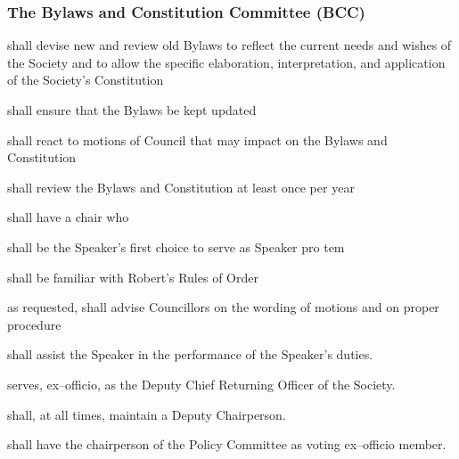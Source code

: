 \subsubsection{The Bylaws and Constitution Committee (BCC)}
\begin{longenum}[ label*=\thesubsubsection.\arabic*., align=left]
	\item shall devise new and review old Bylaws to reflect the current needs and wishes of the Society and to allow the specific elaboration, interpretation, and application of the Society's Constitution 
    \item shall ensure that the Bylaws be kept updated
    \item shall react to motions of Council that may impact on the Bylaws and Constitution
    \item shall review the Bylaws and Constitution at least once per year
    \item shall have a chair who
    \begin{longenum}[ label*=\arabic*., align=left]
		\item shall be the Speaker's first choice to serve as Speaker pro tem
        \item shall be familiar with Robert's Rules of Order
        \item as requested, shall advise Councillors on the wording of motions and on proper procedure
        \item shall assist the Speaker in the performance of the Speaker's duties.
        \item serves, ex--officio, as the Deputy Chief Returning Officer of the Society.
     
        \end{longenum}
    \item shall, at all times, maintain a Deputy Chairperson.
    \item shall have the chairperson of the Policy Committee as voting ex--officio member.
\end{longenum}

